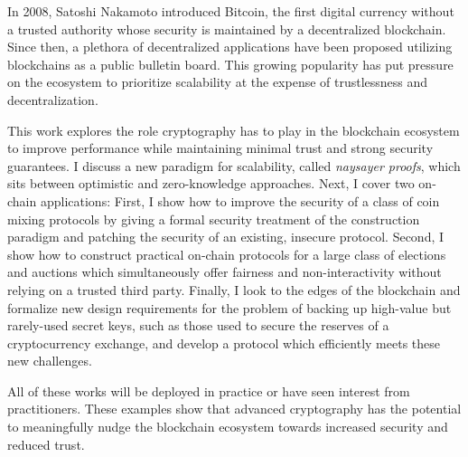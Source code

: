 In 2008, Satoshi Nakamoto introduced Bitcoin, the first digital currency without a trusted authority whose security is maintained by a decentralized blockchain. Since then, a plethora of decentralized applications have been proposed utilizing blockchains as a public bulletin board. This growing popularity has put pressure on the ecosystem to prioritize scalability at the expense of trustlessness and decentralization.

This work explores the role cryptography has to play in the blockchain ecosystem to improve performance while maintaining minimal trust and strong security guarantees. 
I discuss a new paradigm for scalability, called \emph{naysayer proofs}, which sits between optimistic and zero-knowledge approaches.
Next, I cover two on-chain applications:
First, I show how to improve the security of a class of coin mixing protocols by giving a formal security treatment of the construction paradigm and patching the security of an existing, insecure protocol. 
Second, I show how to construct practical on-chain protocols for a large class of elections and auctions which simultaneously offer fairness and non-interactivity without relying on a trusted third party. 
Finally, I look to the edges of the blockchain and formalize new design requirements for the problem of backing up high-value but rarely-used secret keys, such as those used to secure the reserves of a cryptocurrency exchange, and develop a protocol which efficiently meets these new challenges.

All of these works will be deployed in practice or have seen interest from practitioners. These examples show that advanced cryptography has the potential to meaningfully nudge the blockchain ecosystem towards increased security and reduced trust.

